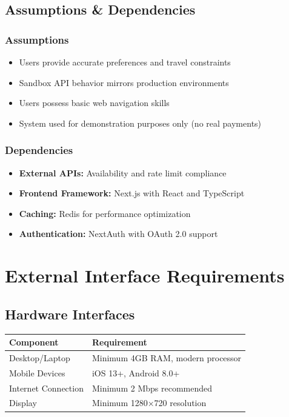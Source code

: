 \documentclass[12pt,a4paper]{article}
\begin{document}
\subsection{Assumptions \& Dependencies}

\subsubsection{Assumptions}

\begin{itemize}[leftmargin=*, itemsep=0.3em]
    \item Users provide accurate preferences and travel constraints
    \item Sandbox API behavior mirrors production environments
    \item Users possess basic web navigation skills
    \item System used for demonstration purposes only (no real payments)
\end{itemize}

\subsubsection{Dependencies}

\begin{itemize}[leftmargin=*, itemsep=0.3em]
    \item \textbf{External APIs:} Availability and rate limit compliance
    \item \textbf{Frontend Framework:} Next.js with React and TypeScript
    \item \textbf{Caching:} Redis for performance optimization
    \item \textbf{Authentication:} NextAuth with OAuth 2.0 support
\end{itemize}

\section{External Interface Requirements}

\subsection{Hardware Interfaces}

\begin{table}[htbp]
\centering
\begin{tabular}{L{5cm}L{8cm}}
    \toprule
    \textbf{Component} & \textbf{Requirement} \\
    \midrule
    Desktop/Laptop & Minimum 4GB RAM, modern processor \\
    Mobile Devices & iOS 13+, Android 8.0+ \\
    Internet Connection & Minimum 2 Mbps recommended \\
    Display & Minimum 1280×720 resolution \\
    \bottomrule
\end{tabular}
\end{table}
\end{document}
